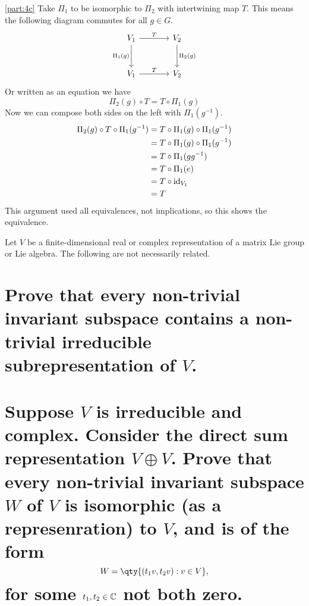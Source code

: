 \documentclass[
	pages,
	boxes,
	color=WildStrawberry
]{homework}
\begin{document}
\begin{solution}
	\ref{part:4c}
	Take $\Pi_1$ to be isomorphic to $\Pi_2$ with intertwining map $T$. This means the following diagram commutes for all $g\in G$.
	\begin{equation*}
		\begin{tikzcd}[row sep=large, column sep=large]
			V_1 \arrow{r}{T} \arrow[swap]{d}{\Pi_1(g)} & V_2 \arrow{d}{\Pi_2(g)} \\
			V_1 \arrow{r}{T} & V_2
		\end{tikzcd}
	\end{equation*}
	Or written as an equation we have
	\begin{equation*}
		\Pi_2(g)\circ T = T \circ \Pi_1(g)
	\end{equation*}
	Now we can compose both sides on the left with $\Pi_1(g^{-1})$.
	\begin{align*}
		\Pi_2(g)\circ T \circ \Pi_1(g^{-1}) & = T \circ \Pi_1(g) \circ \Pi_1(g^{-1}) \\
		                                    & = T \circ \Pi_1(g) \circ \Pi_1(g^{-1}) \\
		                                    & = T \circ \Pi_1(gg^{-1})               \\
		                                    & = T \circ \Pi_1(e)                     \\
		                                    & = T \circ \operatorname{id}_{V_1}                    \\
		                                    & = T
	\end{align*}
	This argument used all equivalences, not implications, so this shows the equivalence.
\end{solution}

\begin{problem}
Let $V$ be a finite-dimensional real or complex representation of a matrix Lie group or Lie algebra. The following are not necessarily related.
\begin{parts}
	\part{Prove that every non-trivial invariant subspace contains a non-trivial irreducible subrepresentation of $V$.}\label{part:5a}
	\part{Suppose $V$ is irreducible and complex. Consider the direct sum representation $V \oplus V$. Prove that every non-trivial invariant subspace $W$ of $V$ is isomorphic (as a represenration) to $V$, and is of the form
		\[
			W = \qty{(t_1v, t_2v) : v \in V},
		\]
		for some $t_1, t_2 \in \mathbb{C}$ not both zero.}\label{part:5b}
\end{parts}
\end{problem}
\end{document}
